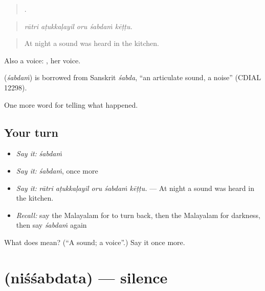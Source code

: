 \begin{quote}
    .
\end{quote}

\begin{quote}
\emph{rātri aṭukkaḷayil oru śabdaṁ kēṭṭu.}
\end{quote}

\begin{quote}
At night a sound was heard in the kitchen.
\end{quote}

Also a voice:  , her voice.

\begin{cousinweb}
\textbf{} (\emph{śabdaṁ}) is borrowed from Sanskrit \emph{śabda}, \textquotedblleft{}an articulate sound, a noise\textquotedblright{} (CDIAL 12298).
\end{cousinweb}

\begin{grammarlens}[title={What you've built}]
One more word for telling what happened.
\end{grammarlens}

\subsection*{Your turn}
\begin{itemize}
\raggedright
  \item \emph{Say it:} \emph{śabdaṁ}
  \item \emph{Say it:} \emph{śabdaṁ}, once more
  \item \emph{Say it:} \emph{rātri aṭukkaḷayil oru śabdaṁ kēṭṭu.} — At night a sound was heard in the kitchen.
  \item \emph{Recall:} say the Malayalam for to turn back, then the Malayalam for darkness, then say \emph{śabdaṁ} again
\end{itemize}

\begin{tcolorbox}[breakable,colback=teal!4,colframe=teal!35!black,title={Before you move on}]
What does  mean? (\textquotedblleft{}A sound; a voice\textquotedblright{}.) Say it once more.
\end{tcolorbox}
\section[\texorpdfstring{\ml{നിശ്ശബ്ദത} (niśśabdata)}{നിശ്ശബ്ദത (niśśabdata)}]{ (niśśabdata) — silence}

